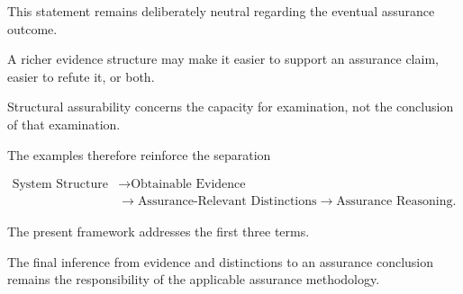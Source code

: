 This statement remains deliberately neutral regarding the eventual
assurance outcome.

A richer evidence structure may make it easier to support an
assurance claim, easier to refute it, or both.

Structural assurability concerns the capacity for examination,
not the conclusion of that examination.

The examples therefore reinforce the separation

\begin{equation}
  \boxed{
    \begin{aligned}
      \text{System Structure}
       & \rightarrow
      \text{Obtainable Evidence} \\
       & \rightarrow
      \text{Assurance-Relevant Distinctions}
      \rightarrow
      \text{Assurance Reasoning}.
    \end{aligned}
  }
\end{equation}

The present framework addresses the first three terms.

The final inference from evidence and distinctions to an assurance
conclusion remains the responsibility of the applicable assurance methodology.
